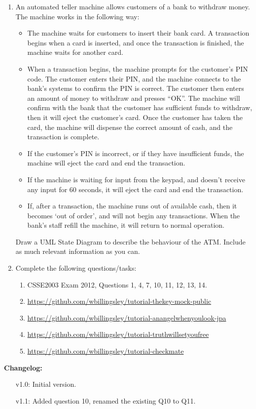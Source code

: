 \documentclass[a4paper,11pt]{article}
\begin{document}
\begin{enumerate}
\item
An automated teller machine allows customers of a bank to withdraw money.
The machine works in the following way:
\begin{itemize}
\item The machine waits for customers to insert their bank card. A transaction
begins when a card is inserted, and once the transaction is finished, the
machine waits for another card.
\item
When a transaction begins, the machine prompts for the customer's PIN code.
The customer enters their PIN, and the machine connects to the bank's systems
to confirm the PIN is correct. The customer then enters an amount of money to
withdraw and presses ``OK''.
The machine will confirm with the bank that the customer has sufficient funds
to withdraw, then it will eject the customer's card. Once the customer has
taken the card, the machine will dispense the correct amount of cash, and the
transaction is complete.
\item
If the customer's PIN is incorrect, or if they have insufficient funds, the
machine will eject the card and end the transaction.
\item
If the machine is waiting for input from the keypad, and doesn't receive any
input for 60 seconds, it will eject the card and end the transaction.
\item
If, after a transaction, the machine runs out of available cash, then it
becomes `out of order', and will not begin any transactions. When the bank's
staff refill the machine, it will return to normal operation.
\end{itemize}
Draw a UML State Diagram to describe the behaviour of the ATM. Include as much
relevant information as you can.

\item
Complete the following questions/tasks:
\begin{enumerate}
\item
CSSE2003 Exam 2012, Questions 1, 4, 7, 10, 11, 12, 13, 14.
\item
\url{https://github.com/wbillingsley/tutorial-thekey-mock-public}
\item
\url{https://github.com/wbillingsley/tutorial-anangelwhenyoulook-jpa}
\item
\url{https://github.com/wbillingsley/tutorial-truthwillsetyoufree}
\item
\url{https://github.com/wbillingsley/tutorial-checkmate}
\end{enumerate}

\end{enumerate}

\vspace{1cm}

{\bf Changelog:}
\begin{enumerate}
\item[v1.0:] Initial version.
\item[v1.1:] Added question 10, renamed the existing Q10 to Q11.
\end{enumerate}
\end{document}
